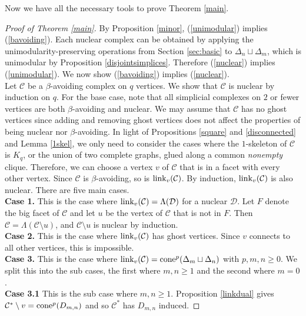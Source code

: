 \documentclass[letterpaper,12pt]{amsart}
\theoremstyle{plain}
\theoremstyle{definition}
\theoremstyle{remark}
\newcommand{\link}{\textnormal{link}}
\newcommand{\cone}{\textnormal{cone}}
\begin{document}
Now we have all the necessary tools to prove Theorem \ref{main}.

\begin{proof}[Proof of Theorem \ref{main}]
	By Proposition \ref{minor}, (\ref{unimodular}) implies (\ref{bavoiding}).
	Each nuclear complex can be obtained by applying the unimodularity-preserving operations
	from Section \ref{sec:basic} to $\Delta_n \sqcup \Delta_m$, which is unimodular by Proposition \ref{disjointsimplices}.
	Therefore (\ref{nuclear}) implies (\ref{unimodular}).
	We now show (\ref{bavoiding}) implies (\ref{nuclear}).
	\\
	\indent
	Let $\mathcal{C}$ be a $\beta$-avoiding complex on $q$ vertices.
	We show that $\mathcal{C}$ is nuclear by induction on $q$.
	For the base case, note that all simplicial complexes on $2$ or fewer vertices are both $\beta$-avoiding and nuclear.
	We may assume that $\mathcal{C}$ has no ghost vertices since adding and removing ghost vertices
	does not affect the properties of being nuclear nor $\beta$-avoiding.
	In light of Propositions \ref{square} and \ref{disconnected} and Lemma \ref{1skel},
	we only need to consider the cases where the $1$-skeleton of $\mathcal{C}$ is $K_q$,
	or the union of two complete graphs, glued along a common \emph{nonempty} clique.
	Therefore, we can choose a vertex $v$ of $\mathcal{C}$ that is in a facet with every other vertex.
	Since $\mathcal{C}$ is $\beta$-avoiding, so is $\link_v(\mathcal{C})$.
	By induction, $\link_v(\mathcal{C})$ is also nuclear.
	There are five main cases.
	\\
	\indent
	{\bf Case 1.}
	This is the case where $\link_v(\mathcal{C}) = \Lambda(\mathcal{D})$ for a nuclear $\mathcal{D}$.
	Let $F$ denote the big facet of $\mathcal{C}$ and let $u$ be the vertex of $\mathcal{C}$ that is not in $F$.
	Then $\mathcal{C} = \Lambda(\mathcal{C}\setminus u)$, and $\mathcal{C}\setminus u$ is nuclear by induction.
	\\
	\indent
	{\bf Case 2.}
	This is the case where $\link_v(\mathcal{C})$ has ghost vertices.
	Since $v$ connects to all other vertices, this is impossible.
	\\
	\indent
	{\bf Case 3.}
	This is the case where $\link_v(\mathcal{C}) = \cone^p(\Delta_m \sqcup \Delta_n)$ with $p,m,n \ge 0$.
	We split this into the sub cases, the first where $m,n \ge 1$ and the second where $m = 0$.
	\\
	\indent
	{\bf Case 3.1}
	This is the sub case where $m,n \ge 1$.
	Proposition \ref{linkdual} gives
	$\mathcal{C}^*\setminus v = \cone^p(D_{m,n})$ and so $\mathcal{C}^*$ has $D_{m,n}$ induced.

\end{proof}
\end{document}
